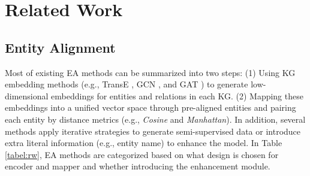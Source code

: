 \documentclass[sigconf]{acmart}
\begin{document}
\section{Related Work}
\subsection{Entity Alignment}
Most of existing EA methods can be summarized into two steps:
(1) Using KG embedding methods (e.g., TransE \cite{DBLP:conf/nips/BordesUGWY13}, GCN \cite{DBLP:journals/corr/KipfW16}, and GAT \cite{DBLP:conf/iclr/VelickovicCCRLB18}) to generate low-dimensional embeddings for entities and relations in each KG.
(2) Mapping these embeddings into a unified vector space through pre-aligned entities and pairing each entity by distance metrics (e.g., \textit{Cosine} and \textit{Manhattan}).
In addition, several methods apply iterative strategies \cite{DBLP:conf/ijcai/SunHZQ18,DBLP:conf/wsdm/MaoWXLW20} to generate semi-supervised data or introduce extra literal information \cite{DBLP:conf/acl/XuWYFSWY19,DBLP:conf/emnlp/WuLFWZ19,DBLP:conf/iclr/FeyL0MK20} (e.g., entity name) to enhance the model.
In Table \ref{tabel:rw}, EA methods are categorized based on what design is chosen for encoder and mapper and whether introducing the enhancement module.

\begin{table}
\begin{center}
\end{center}
\caption{Categorization of some popular EA methods.}\label{tabel:rw}
\vspace{-1em}
\end{table}
\end{document}
